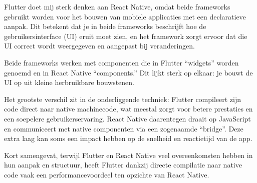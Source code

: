 Flutter doet mij sterk denken aan React Native, omdat beide frameworks gebruikt worden voor het bouwen van mobiele applicaties met een declaratieve aanpak. Dit betekent dat je in beide frameworks beschrijft hoe de gebruikersinterface (UI) eruit moet zien, en het framework zorgt ervoor dat die UI correct wordt weergegeven en aangepast bij veranderingen.

Beide frameworks werken met componenten die in Flutter “widgets” worden genoemd en in React Native “components.” Dit lijkt sterk op elkaar: je bouwt de UI op uit kleine herbruikbare bouwstenen.

Het grootste verschil zit in de onderliggende techniek: Flutter compileert zijn code direct naar native machinecode, wat meestal zorgt voor betere prestaties en een soepelere gebruikerservaring. React Native daarentegen draait op JavaScript en communiceert met native componenten via een zogenaamde “bridge”. Deze extra laag kan soms een impact hebben op de snelheid en reactietijd van de app.

Kort samengevat, terwijl Flutter en React Native veel overeenkomsten hebben in hun aanpak en structuur, heeft Flutter dankzij directe compilatie naar native code vaak een performancevoordeel ten opzichte van React Native.
